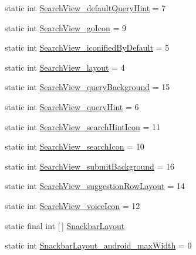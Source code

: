 \begin{DoxyCompactItemize}
static int \hyperlink{classandroid_1_1support_1_1v7_1_1appcompat_1_1R_1_1styleable_ae4b4d1c44649fd0230d2b11b181d19bd}{Search\+View\+\_\+default\+Query\+Hint} = 7
\item 
static int \hyperlink{classandroid_1_1support_1_1v7_1_1appcompat_1_1R_1_1styleable_afd493beb8db4436433dc905ac38231a1}{Search\+View\+\_\+go\+Icon} = 9
\item 
static int \hyperlink{classandroid_1_1support_1_1v7_1_1appcompat_1_1R_1_1styleable_a4dd3091dfa10ff0d05004332a0fbb677}{Search\+View\+\_\+iconified\+By\+Default} = 5
\item 
static int \hyperlink{classandroid_1_1support_1_1v7_1_1appcompat_1_1R_1_1styleable_ad241a6c289e7efe81bf10167a3969b9a}{Search\+View\+\_\+layout} = 4
\item 
static int \hyperlink{classandroid_1_1support_1_1v7_1_1appcompat_1_1R_1_1styleable_a4bfbfa40648f5bbab65bd2ad5dc0bd4d}{Search\+View\+\_\+query\+Background} = 15
\item 
static int \hyperlink{classandroid_1_1support_1_1v7_1_1appcompat_1_1R_1_1styleable_a90f513ff603af9e55eadeff9c70fbbfb}{Search\+View\+\_\+query\+Hint} = 6
\item 
static int \hyperlink{classandroid_1_1support_1_1v7_1_1appcompat_1_1R_1_1styleable_a2794d77a4ddac9ee228c28d219ff6b31}{Search\+View\+\_\+search\+Hint\+Icon} = 11
\item 
static int \hyperlink{classandroid_1_1support_1_1v7_1_1appcompat_1_1R_1_1styleable_a8e6e122f919effcc0243ea3cc6d47524}{Search\+View\+\_\+search\+Icon} = 10
\item 
static int \hyperlink{classandroid_1_1support_1_1v7_1_1appcompat_1_1R_1_1styleable_a7d61d4e0aeb32c5c70b0aabb85cf4eb6}{Search\+View\+\_\+submit\+Background} = 16
\item 
static int \hyperlink{classandroid_1_1support_1_1v7_1_1appcompat_1_1R_1_1styleable_a721bc13b98ace8002519af52fdaf8a26}{Search\+View\+\_\+suggestion\+Row\+Layout} = 14
\item 
static int \hyperlink{classandroid_1_1support_1_1v7_1_1appcompat_1_1R_1_1styleable_ab659f692825b4cff1b7e0b64a992de3d}{Search\+View\+\_\+voice\+Icon} = 12
\item 
static final int \mbox{[}$\,$\mbox{]} \hyperlink{classandroid_1_1support_1_1v7_1_1appcompat_1_1R_1_1styleable_a9887ec2f8bf8ba963b30b5160dcd1e61}{Snackbar\+Layout}
\item 
static int \hyperlink{classandroid_1_1support_1_1v7_1_1appcompat_1_1R_1_1styleable_a350ec521c59036c206387ba98d7224e8}{Snackbar\+Layout\+\_\+android\+\_\+max\+Width} = 0

\end{DoxyCompactItemize}
